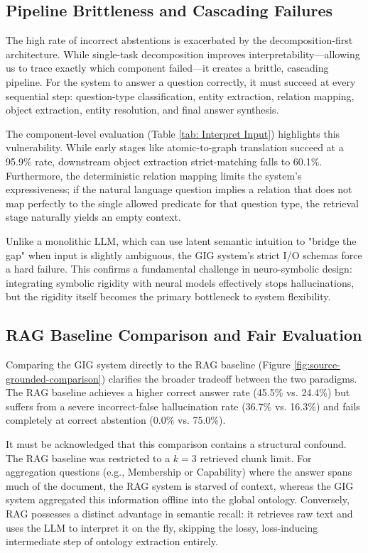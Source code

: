 \subsection{Pipeline Brittleness and Cascading Failures}
The high rate of incorrect abstentions is exacerbated by the decomposition-first architecture. While single-task decomposition improves interpretability—allowing us to trace exactly which component failed—it creates a brittle, cascading pipeline. For the system to answer a question correctly, it must succeed at every sequential step: question-type classification, entity extraction, relation mapping, object extraction, entity resolution, and final answer synthesis. 

The component-level evaluation (Table \ref{tab: Interpret Input}) highlights this vulnerability. While early stages like atomic-to-graph translation succeed at a 95.9\% rate, downstream object extraction strict-matching falls to 60.1\%. Furthermore, the deterministic relation mapping limits the system's expressiveness; if the natural language question implies a relation that does not map perfectly to the single allowed predicate for that question type, the retrieval stage naturally yields an empty context. 

Unlike a monolithic LLM, which can use latent semantic intuition to "bridge the gap" when input is slightly ambiguous, the GIG system's strict I/O schemas force a hard failure. This confirms a fundamental challenge in neuro-symbolic design: integrating symbolic rigidity with neural models effectively stops hallucinations, but the rigidity itself becomes the primary bottleneck to system flexibility.

\subsection{RAG Baseline Comparison and Fair Evaluation}
Comparing the GIG system directly to the RAG baseline (Figure \ref{fig:source-grounded-comparison}) clarifies the broader tradeoff between the two paradigms. The RAG baseline achieves a higher correct answer rate (45.5\% vs. 24.4\%) but suffers from a severe incorrect-false hallucination rate (36.7\% vs. 16.3\%) and fails completely at correct abstention (0.0\% vs. 75.0\%).

It must be acknowledged that this comparison contains a structural confound. The RAG baseline was restricted to a $k=3$ retrieved chunk limit. For aggregation questions (e.g., Membership or Capability) where the answer spans much of the document, the RAG system is starved of context, whereas the GIG system aggregated this information offline into the global ontology. Conversely, RAG possesses a distinct advantage in semantic recall: it retrieves raw text and uses the LLM to interpret it on the fly, skipping the lossy, loss-inducing intermediate step of ontology extraction entirely.

